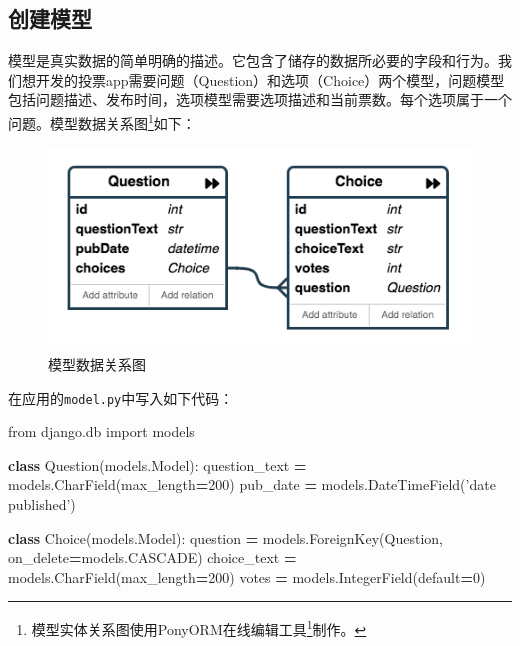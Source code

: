 \documentclass[]{ctexbook}
\newenvironment{Shaded}{\begin{snugshade}}{\end{snugshade}}
\newcommand{\DecValTok}[1]{\textcolor[rgb]{0.00,0.00,0.81}{#1}}
\newcommand{\ImportTok}[1]{#1}
\newcommand{\KeywordTok}[1]{\textcolor[rgb]{0.13,0.29,0.53}{\textbf{#1}}}
\newcommand{\NormalTok}[1]{#1}
\newcommand{\OperatorTok}[1]{\textcolor[rgb]{0.81,0.36,0.00}{\textbf{#1}}}
\newcommand{\StringTok}[1]{\textcolor[rgb]{0.31,0.60,0.02}{#1}}
\renewcommand{\href}[2]{#2\footnote{\url{#1}}}
\begin{document}
\hypertarget{ux521bux5efaux6a21ux578b}{%
\subsection{创建模型}\label{ux521bux5efaux6a21ux578b}}

模型是真实数据的简单明确的描述。它包含了储存的数据所必要的字段和行为。我们想开发的投票app需要问题（Question）和选项（Choice）两个模型，问题模型包括问题描述、发布时间，选项模型需要选项描述和当前票数。每个选项属于一个问题。模型数据关系图\footnote{模型实体关系图使用\href{https://editor.ponyorm.com}{PonyORM在线编辑工具}制作。}如下：

\begin{figure}
\centering
\includegraphics{images/django-entry.png}
\caption{模型数据关系图}
\end{figure}

在应用的\texttt{model.py}中写入如下代码：

\begin{Shaded}
\begin{Highlighting}[]
\ImportTok{from}\NormalTok{ django.db }\ImportTok{import}\NormalTok{ models}

\KeywordTok{class}\NormalTok{ Question(models.Model):}
\NormalTok{    question_text }\OperatorTok{=}\NormalTok{ models.CharField(max_length}\OperatorTok{=}\DecValTok{200}\NormalTok{)}
\NormalTok{    pub_date }\OperatorTok{=}\NormalTok{ models.DateTimeField(}\StringTok{'date published'}\NormalTok{)}

\KeywordTok{class}\NormalTok{ Choice(models.Model):}
\NormalTok{    question }\OperatorTok{=}\NormalTok{ models.ForeignKey(Question, on_delete}\OperatorTok{=}\NormalTok{models.CASCADE)}
\NormalTok{    choice_text }\OperatorTok{=}\NormalTok{ models.CharField(max_length}\OperatorTok{=}\DecValTok{200}\NormalTok{)}
\NormalTok{    votes }\OperatorTok{=}\NormalTok{ models.IntegerField(default}\OperatorTok{=}\DecValTok{0}\NormalTok{)}
\end{Highlighting}
\end{Shaded}
\end{document}
